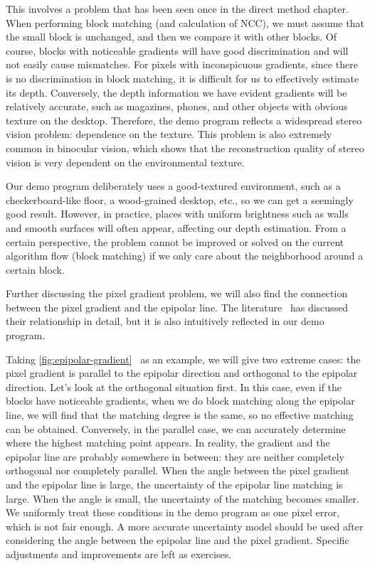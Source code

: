 This involves a problem that has been seen once in the direct method chapter. When performing block matching (and calculation of NCC), we must assume that the small block is unchanged, and then we compare it with other blocks. Of course, blocks with noticeable gradients will have good discrimination and will not easily cause mismatches. For pixels with inconspicuous gradients, since there is no discrimination in block matching, it is difficult for us to effectively estimate its depth. Conversely, the depth information we have evident gradients will be relatively accurate, such as magazines, phones, and other objects with obvious texture on the desktop. Therefore, the demo program reflects a widespread stereo vision problem: dependence on the texture. This problem is also extremely common in binocular vision, which shows that the reconstruction quality of stereo vision is very dependent on the environmental texture.

Our demo program deliberately uses a good-textured environment, such as a checkerboard-like floor, a wood-grained desktop, etc., so we can get a seemingly good result. However, in practice, places with uniform brightness such as walls and smooth surfaces will often appear, affecting our depth estimation. From a certain perspective, the problem cannot be improved or solved on the current algorithm flow (block matching) if we only care about the neighborhood around a certain block.

Further discussing the pixel gradient problem, we will also find the connection between the pixel gradient and the epipolar line. The literature~\cite{Engel2013} has discussed their relationship in detail, but it is also intuitively reflected in our demo program.

Taking \autoref{fig:epipolar-gradient}~ as an example, we will give two extreme cases: the pixel gradient is parallel to the epipolar direction and orthogonal to the epipolar direction. Let's look at the orthogonal situation first. In this case, even if the blocks have noticeable gradients, when we do block matching along the epipolar line, we will find that the matching degree is the same, so no effective matching can be obtained. Conversely, in the parallel case, we can accurately determine where the highest matching point appears. In reality, the gradient and the epipolar line are probably somewhere in between: they are neither completely orthogonal nor completely parallel. When the angle between the pixel gradient and the epipolar line is large, the uncertainty of the epipolar line matching is large. When the angle is small, the uncertainty of the matching becomes smaller. We uniformly treat these conditions in the demo program as one pixel error, which is not fair enough. A more accurate uncertainty model should be used after considering the angle between the epipolar line and the pixel gradient. Specific adjustments and improvements are left as exercises.


